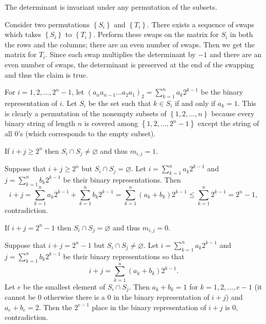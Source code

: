 \begin{solutionlemma}
The determinant is invariant under any permutation of the subsets.
\end{solutionlemma}

\begin{lemmaproof}
Consider two permutations $\left\{S_i\right\}$ and $\left\{T_i\right\}$. There exists a sequence of swaps which takes $\left\{S_i\right\}$ to $\left\{T_i\right\}$. Perform these swaps on the matrix for $S_i$ in both the rows and the columns; there are an even number of swaps. Then we get the matrix for $T_i$. Since each swap multiplies the determinant by $-1$ and there are an even number of swaps, the determinant is preserved at the end of the swapping and thus the claim is true.
\end{lemmaproof}

For $i=1,2,\ldots,2^n-1$, let $\left(a_na_{n-1}\ldots a_2a_1\right)_2=\displaystyle\sum_{k=1}^na_k2^{k-1}$ be the binary representation of $i$. Let $S_i$ be the set such that $k\in S_i$ if and only if $a_k=1$. This is clearly a permutation of the nonempty subsets of $\left\{1,2,\ldots,n\right\}$ because every binary string of length $n$ is covered among $\left\{1,2,\ldots,2^n-1\right\}$ except the string of all $0$'s (which corresponds to the empty subset).
\begin{claim}
If $i+j\geq2^n$ then $S_i\cap S_j\neq\varnothing$ and thus $m_{i,j}=1$.
\end{claim}
\begin{lemmaproof}
Suppose that $i+j\geq2^n$ but $S_i\cap S_j=\varnothing$. Let $i=\displaystyle\sum_{k=1}^na_k2^{k-1}$ and $j=\displaystyle\sum_{k=1}^nb_k2^{k-1}$ be their binary representations. Then \[i+j=\displaystyle\sum_{k=1}^na_k2^{k-1}+\displaystyle\sum_{k=1}^nb_k2^{k-1}=\displaystyle\sum_{k=1}^n\left(a_k+b_k\right)2^{k-1}\leq\displaystyle\sum_{k=1}^n2^{k-1}=2^n-1,\] contradiction.
\end{lemmaproof}

\begin{claim}
If $i+j=2^n-1$ then $S_i\cap S_j=\varnothing$ and thus $m_{i,j}=0$.
\end{claim}

\begin{lemmaproof}
Suppose that $i+j=2^n-1$ but $S_i\cap S_j\neq\varnothing$. Let $i=\displaystyle\sum_{k=1}^na_k2^{k-1}$ and $j=\displaystyle\sum_{k=1}^nb_k2^{k-1}$ be their binary representations so that \[i+j=\displaystyle\sum_{k=1}^n\left(a_k+b_k\right)2^{k-1}.\] Let $e$ be the smallest element of $S_i\cap S_j$. Then $a_k+b_k=1$ for $k=1,2,\ldots,e-1$ (it cannot be $0$ otherwise there is a $0$ in the binary representation of $i+j$) and $a_e+b_e=2$. Then the $2^{e-1}$ place in the binary representation of $i+j$ is $0$, contradiction.
\end{lemmaproof}

